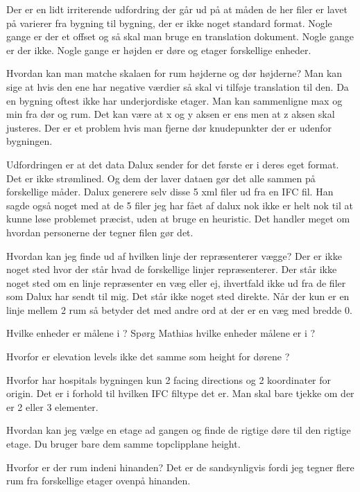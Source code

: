 Der er en lidt irriterende udfordring der går ud på at måden de her filer er lavet på varierer fra bygning til bygning, der er ikke noget standard format. Nogle gange er der et offset og så skal man bruge en translation dokument. Nogle gange er der ikke. Nogle gange er højden er døre og etager forskellige enheder.

Hvordan kan man matche skalaen for rum højderne og dør højderne?
Man kan sige at hvis den ene har negative værdier så skal vi tilføje translation til den. Da en bygning oftest ikke har underjordiske etager.
Man kan sammenligne max og min fra dør og rum.
Det kan være at x og y aksen er ens men at z aksen skal justeres.
Der er et problem hvis man fjerne dør knudepunkter der er udenfor bygningen.






Udfordringen er at det data Dalux sender for det første er i deres eget format. Det er ikke strømlined. Og dem der laver dataen gør det alle sammen på forskellige måder.
Dalux generere selv disse 5 xml filer ud fra en IFC fil.
Han sagde også noget med at de 5 filer jeg har fået af dalux nok ikke er helt nok til at kunne løse problemet præcist, uden at bruge en heuristic.
Det handler meget om hvordan personerne der tegner filen gør det.

Hvordan kan jeg finde ud af hvilken linje der repræsenterer vægge?
Der er ikke noget sted hvor der står hvad de forskellige linjer repræsenterer. Der står ikke noget sted om en linje repræsenter en væg eller ej, ihvertfald ikke ud fra de filer som Dalux har sendt til 
mig. Det står ikke noget sted direkte. 
Når der kun er en linje mellem 2 rum så betyder det med andre ord at der er en væg med bredde 0. 

Hvilke enheder er målene i ?
Spørg Mathias hvilke enheder målene er i ?

Hvorfor er elevation levels ikke det samme som height for dørene ? 

Hvorfor har hospitals bygningen kun 2 facing directions og 2 koordinater for origin.
Det er i forhold til hvilken IFC filtype det er.
Man skal bare tjekke om der er 2 eller 3 elementer.

Hvordan kan jeg vælge en etage ad gangen og finde de rigtige døre til den rigtige etage.
Du bruger bare dem samme topclipplane height.

Hvorfor er der rum indeni hinanden?
Det er de sandsynligvis fordi jeg tegner flere rum fra forskellige etager ovenpå hinanden.

